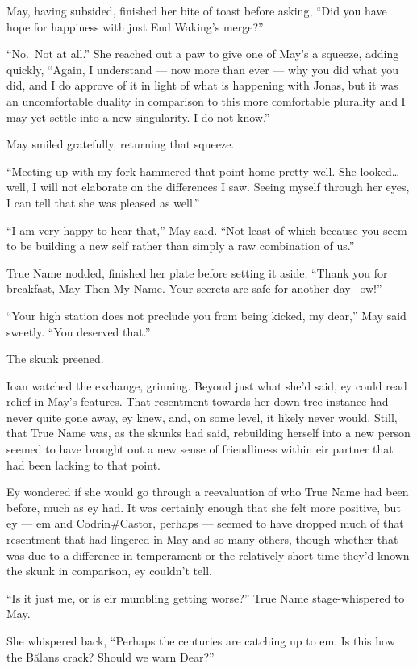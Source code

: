 May, having subsided, finished her bite of toast before asking, ``Did you have hope for happiness with just End Waking's merge?''

``No.~Not at all.'' She reached out a paw to give one of May's a squeeze, adding quickly, ``Again, I understand — now more than ever — why you did what you did, and I do approve of it in light of what is happening with Jonas, but it was an uncomfortable duality in comparison to this more comfortable plurality and I may yet settle into a new singularity. I do not know.''

May smiled gratefully, returning that squeeze.

``Meeting up with my fork hammered that point home pretty well. She looked\ldots well, I will not elaborate on the differences I saw. Seeing myself through her eyes, I can tell that she was pleased as well.''

``I am very happy to hear that,'' May said. ``Not least of which because you seem to be building a new self rather than simply a raw combination of us.''

True Name nodded, finished her plate before setting it aside. ``Thank you for breakfast, May Then My Name. Your secrets are safe for another day-- ow!''

``Your high station does not preclude you from being kicked, my dear,'' May said sweetly. ``You deserved that.''

The skunk preened.

Ioan watched the exchange, grinning. Beyond just what she'd said, ey could read relief in May's features. That resentment towards her down-tree instance had never quite gone away, ey knew, and, on some level, it likely never would. Still, that True Name was, as the skunks had said, rebuilding herself into a new person seemed to have brought out a new sense of friendliness within eir partner that had been lacking to that point.

Ey wondered if she would go through a reevaluation of who True Name had been before, much as ey had. It was certainly enough that she felt more positive, but ey — em and Codrin\#Castor, perhaps — seemed to have dropped much of that resentment that had lingered in May and so many others, though whether that was due to a difference in temperament or the relatively short time they'd known the skunk in comparison, ey couldn't tell.

``Is it just me, or is eir mumbling getting worse?'' True Name stage-whispered to May.

She whispered back, ``Perhaps the centuries are catching up to em. Is this how the Bălans crack? Should we warn Dear?''

